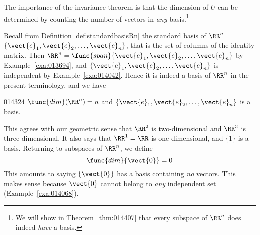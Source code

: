 \noindent The importance of the invariance theorem is that the dimension of $U$ can be determined by counting the number of vectors in \textit{any} basis.\footnote{We will show in Theorem~\ref{thm:014407} that every subspace of $\RR^n$ does indeed \textit{have} a basis.}

Recall from Definition \ref{def:standardbasisRn} the standard basis of $\RR^n$ $\{\vect{e}_{1}, \vect{e}_{2}, \dots, \vect{e}_{n}\}$,  that is the set of columns of the identity matrix. Then $\RR^n = \func{span}\{\vect{e}_{1}, \vect{e}_{2}, \dots, \vect{e}_{n}\}$ by Example~\ref{exa:013694}, and $\{\vect{e}_{1}, \vect{e}_{2}, \dots, \vect{e}_{n}\}$ is independent by Example~\ref{exa:014042}. Hence it is indeed a basis of $\RR^n$ in the present terminology, and we have

\begin{example}{}{014324}
$\func{dim}(\RR^n) = n$ and $\{\vect{e}_{1}, \vect{e}_{2}, \dots, \vect{e}_{n}\}$ is a basis.
\end{example}

This agrees with our geometric sense that $\RR^2$ is two-dimensional and $\RR^3$ is three-dimensional. It also says that $\RR^1 = \RR$ is one-dimensional, and $\{1\}$ is a basis. Returning to subspaces of $\RR^n$, we define
\begin{equation*}
\func{dim}\{\vect{0}\} = 0
\end{equation*}
This amounts to saying $\{\vect{0}\}$ has a basis containing \textit{no} vectors. This makes sense because $\vect{0}$ cannot belong to \textit{any} independent set (Example~\ref{exa:014068}).

